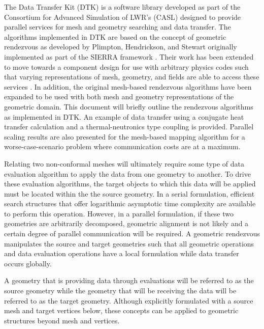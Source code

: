 \documentclass{mc2013}
\begin{document}
The Data Transfer Kit (DTK) is a software library developed as part of
the Consortium for Advanced Simulation of LWR's (CASL)
\cite{u.s._department_of_energy_casl_2011} designed to provide
parallel services for mesh and geometry searching and data
transfer. The algorithms implemented in DTK are based on the concept
of geometric rendezvous as developed by Plimpton, Hendrickson, and
Stewart \cite{Plimpton_2004} originally implemented as part of the
SIERRA framework \cite{Stewart_2004}. Their work has been extended to
move towards a component design for use with arbitrary physics codes
such that varying representations of mesh, geometry, and fields are
able to access these services \cite{Chand_2008}. In addition, the
original mesh-based rendezvous algorithms have been expanded to be
used with both mesh and geometry representations of the geometric
domain. This document will briefly outline the rendezvous algorithms
as implemented in DTK. An example of data transfer using a conjugate
heat transfer calculation and a thermal-neutronics type coupling is
provided. Parallel scaling results are also presented for the
mesh-based mapping algorithm for a worse-case-scenario problem where
communication costs are at a maximum.


\label{sec:geometric_rendezvous}

Relating two non-conformal meshes will ultimately require some type of
data evaluation algorithm to apply the data from one geometry to
another. To drive these evaluation algorithms, the target objects to
which this data will be applied must be located within the the source
geometry. In a serial formulation, efficient search structures that
offer logarithmic asymptotic time complexity are available to perform
this operation. However, in a parallel formulation, if these two
geometries are arbitrarily decomposed, geometric alignment is not
likely and a certain degree of parallel communication will be
required. A geometric rendezvous manipulates the source and target
geometries such that all geometric operations and data evaluation
operations have a local formulation while data transfer occurs
globally.

A geometry that is providing data through evaluations will be referred
to as the source geometry while the geometry that will be receiving
the data will be referred to as the target geometry. Although
explicitly formulated with a source mesh and target vertices below,
these concepts can be applied to geometric structures beyond mesh and
vertices.
\end{document}
